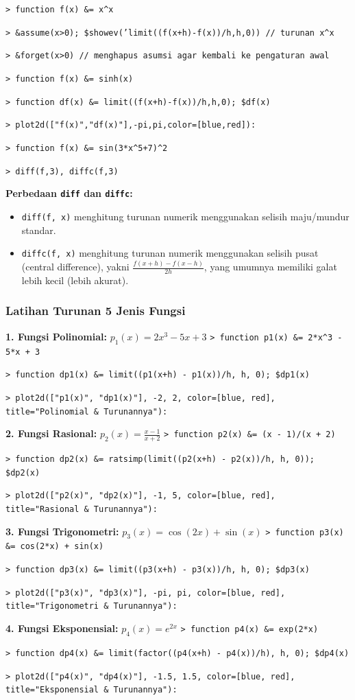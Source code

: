 \documentclass[11pt, a4paper]{article}
\newcommand{\emtcmd}[1]{\noindent\texttt{\textcolor{emtcommand}{>}\ #1}\par\smallskip}
\begin{document}
\emtcmd{function f(x) \&= x\^{}x}
\emtcmd{\&assume(x>0); \$showev('limit((f(x+h)-f(x))/h,h,0)) \textcolor{emtcomment}{// turunan x\^{}x}}
\emtcmd{\&forget(x>0) \textcolor{emtcomment}{// menghapus asumsi agar kembali ke pengaturan awal}}

\emtcmd{function f(x) \&= sinh(x)}
\emtcmd{function df(x) \&= limit((f(x+h)-f(x))/h,h,0); \$df(x)}
\emtcmd{plot2d(["f(x)","df(x)"],-pi,pi,color=[blue,red]):}

\emtcmd{function f(x) \&= sin(3*x\^{}5+7)\^{}2}
\emtcmd{diff(f,3), diffc(f,3)}

\textbf{Perbedaan \texttt{diff} dan \texttt{diffc}:}
\begin{itemize}
    \item \texttt{diff(f, x)} menghitung turunan numerik menggunakan selisih maju/mundur standar.
    \item \texttt{diffc(f, x)} menghitung turunan numerik menggunakan selisih pusat (central difference), yakni $\frac{f(x+h) - f(x-h)}{2h}$, yang umumnya memiliki galat lebih kecil (lebih akurat).
\end{itemize}

\subsubsection*{Latihan Turunan 5 Jenis Fungsi}

\textbf{1. Fungsi Polinomial:} $p_1(x) = 2x^3 - 5x + 3$
\emtcmd{function p1(x) \&= 2*x\^{}3 - 5*x + 3}
\emtcmd{function dp1(x) \&= limit((p1(x+h) - p1(x))/h, h, 0); \$dp1(x)}
\emtcmd{plot2d(["p1(x)", "dp1(x)"], -2, 2, color=[blue, red], title="Polinomial \& Turunannya"):}

\textbf{2. Fungsi Rasional:} $p_2(x) = \frac{x - 1}{x + 2}$
\emtcmd{function p2(x) \&= (x - 1)/(x + 2)}
\emtcmd{function dp2(x) \&= ratsimp(limit((p2(x+h) - p2(x))/h, h, 0)); \$dp2(x)}
\emtcmd{plot2d(["p2(x)", "dp2(x)"], -1, 5, color=[blue, red], title="Rasional \& Turunannya"):}

\textbf{3. Fungsi Trigonometri:} $p_3(x) = \cos(2x) + \sin(x)$
\emtcmd{function p3(x) \&= cos(2*x) + sin(x)}
\emtcmd{function dp3(x) \&= limit((p3(x+h) - p3(x))/h, h, 0); \$dp3(x)}
\emtcmd{plot2d(["p3(x)", "dp3(x)"], -pi, pi, color=[blue, red], title="Trigonometri \& Turunannya"):}

\textbf{4. Fungsi Eksponensial:} $p_4(x) = e^{2x}$
\emtcmd{function p4(x) \&= exp(2*x)}
\emtcmd{function dp4(x) \&= limit(factor((p4(x+h) - p4(x))/h), h, 0); \$dp4(x)}
\emtcmd{plot2d(["p4(x)", "dp4(x)"], -1.5, 1.5, color=[blue, red], title="Eksponensial \& Turunannya"):}
\end{document}
